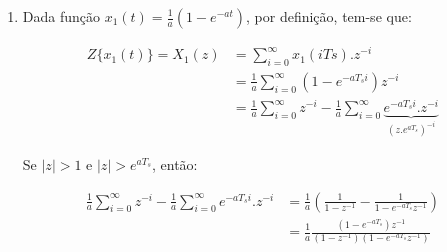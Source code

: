 \documentclass{article}
\begin{document}
\begin{enumerate}
\begin{itemize}
	\begin{equation}
	\therefore Z\{\sum_{i=0}^{n}x[i-1] \} = \frac{z^{-1}}{1-z^{-1}}.X(z) \hspace{10pt} \blacksquare
	\end{equation}

	\item $\lim\limits_{z \rightarrow 1} X(z) = \sum_{i=0}^{\infty}x[i]$

	\begin{equation}
	\lim\limits_{z \rightarrow 1} X(z) & = \lim\limits_{z \rightarrow 1} \sum_{i=0}^{\infty} x[i].z^{-i} = \sum_{i=0}^{\infty} x[i]
	\end{equation}
	
	\begin{equation}
	\begin{split}
	\therefore \lim\limits_{z \rightarrow 1} X(z) = \sum_{i=0}^{\infty}x[i] \hspace{10pt} \blacksquare
	\end{split}
	\end{equation}
	
\end{itemize}

\item\label{item:ex2b} %
Dada função $x_1(t) = \frac{1}{a} \left( 1 - e^{-at} \right)$, por definição, tem-se que:

	\begin{equation}
	\begin{split}
	Z\{x_1(t)\} = X_1(z) & = \sum_{i=0}^{\infty} x_1(i Ts).z^{-i} \\
	& = \frac{1}{a} \sum_{i=0}^{\infty} \left( 1 - e^{-a T_s i} \right)z^{-i} \\
	& = \frac{1}{a} \sum_{i=0}^{\infty} z^{-i} - \frac{1}{a} \sum_{i=0}^{\infty} \underbrace{e^{-a T_s i}.z^{-i}}_{(z.e^{aT_s})^{-i}}
	\end{split}
	\end{equation}

Se $|z| > 1$ e $|z| > e^{aT_s}$, então:
	
	\begin{equation}
	\begin{split}
	\frac{1}{a} \sum_{i=0}^{\infty} z^{-i} - \frac{1}{a} \sum_{i=0}^{\infty} e^{-a T_s i}.z^{-i} & = \frac{1}{a} (\frac{1}{1-z^ {-1}} - \frac{1}{1-e^{-aT_s} z^ {-1}}) \\
	& = \frac{1}{a} \frac{(1 - e^{-aT_s})z^{-1}}{(1-z^{-1})(1-e^{-aT_s} z^ {-1})}
	\end{split}
	\end{equation}
	

\end{enumerate}
\end{document}
